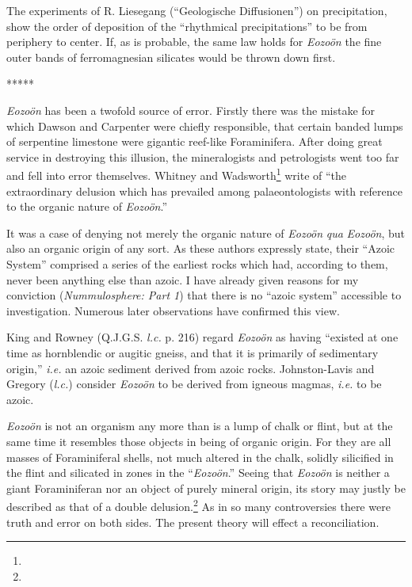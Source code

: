 \documentclass[a4paper, 12pt, oneside]{article}
\begin{document}
The experiments of R. Liesegang (``Geologische Diffusionen'') on precipitation, show the order of deposition of the ``rhythmical precipitations'' to be from periphery to center. If, as is probable, the same law holds for \emph{Eozoön} the fine outer bands of ferromagnesian silicates would be thrown down first. 

\centerline{*\hspace{15mm}*\hspace{15mm}*\hspace{15mm}*\hspace{15mm}*}
\bigskip

\emph{Eozoön} has been a twofold source of error. Firstly there was the mistake for which Dawson and Carpenter were chiefly responsible, that certain banded lumps of serpentine limestone were gigantic reef-like Foraminifera. After doing great service in destroying this illusion, the mineralogists and petrologists went too far and fell into error themselves. Whitney and Wadsworth\footnote{} write of ``the extraordinary delusion which has prevailed among palaeontologists with reference to the organic nature of \emph{Eozoön}.''

It was a case of denying not merely the organic nature of \emph{Eozoön} \emph{qua} \emph{Eozoön}, but also an organic origin of any sort. As these authors expressly state, their ``Azoic System'' comprised a series of the earliest rocks which had, according to them, never been anything else than azoic. I have already given reasons for my conviction (\emph{Nummulosphere: Part 1}) that there is no ``azoic system'' accessible to investigation. Numerous later observations have confirmed this view.

King and Rowney (Q.J.G.S. \emph{l.c.} p. 216) regard \emph{Eozoön} as having ``existed at one time as hornblendic or augitic gneiss, and that it is primarily of sedimentary origin,'' \emph{i.e.} an azoic sediment derived from azoic rocks. Johnston-Lavis and Gregory (\emph{l.c.}) consider \emph{Eozoön} to be derived from igneous magmas, \emph{i.e.} to be azoic.

\emph{Eozoön} is not an organism any more than is a lump of chalk or flint, but at the same time it resembles those objects in being of organic origin. For they are all masses of Foraminiferal shells, not much altered in the chalk, solidly silicified in the flint and silicated in zones in the ``\emph{Eozoön}.'' Seeing that \emph{Eozoön} is neither a giant Foraminiferan nor an object of purely mineral origin, its story may justly be described as that of a double delusion.\footnote{} As in so many controversies there were truth and error on both sides. The present theory will effect a reconciliation.
\end{document}
